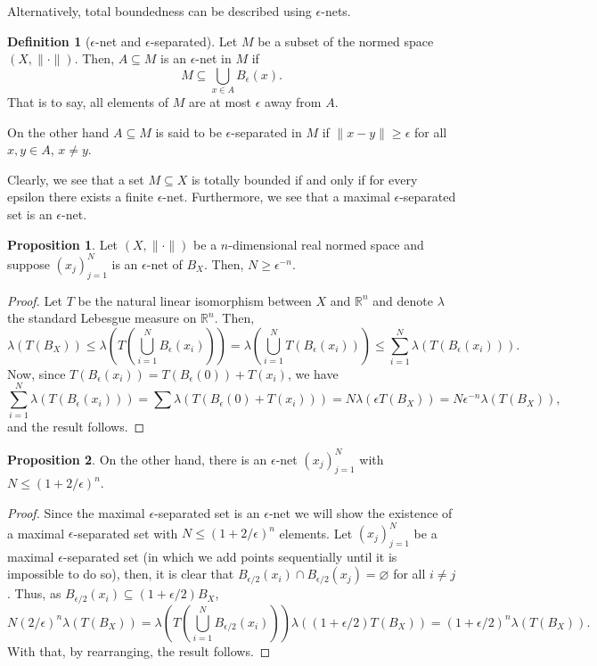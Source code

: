 \documentclass[
]{article}
\theoremstyle{definition}
\theoremstyle{definition}
\newtheorem{definition}{Definition}[section]
\newtheorem{proposition}{Proposition}[section]
\begin{document}
Alternatively, total boundedness can be described using \(\epsilon\)-nets. 

\begin{definition}[\(\epsilon\)-net and \(\epsilon\)-separated]
  Let \(M\) be a subset of the normed space \((X, \|\cdot\|)\). Then, 
  \(A \subseteq M\) is an \(\epsilon\)-net in \(M\) if 
  \[M \subseteq \bigcup_{x \in A} B_\epsilon(x).\]
  That is to say, all elements of \(M\) are at most \(\epsilon\) away from 
  \(A\). 
  
  On the other hand \(A \subseteq M\) is said to be \(\epsilon\)-separated in 
  \(M\) if \(\|x - y\| \ge \epsilon\) for all \(x, y \in A\), \(x \neq y\). 
\end{definition}

Clearly, we see that a set \(M \subseteq X\) is totally bounded if and only if 
for every epsilon there exists a finite \(\epsilon\)-net.
Furthermore, we see that a maximal \(\epsilon\)-separated set is an \(\epsilon\)-net.

\begin{proposition}
  Let \((X, \|\cdot\|)\) be a \(n\)-dimensional real normed space and suppose
  \((x_j)_{j = 1}^N\) is an \(\epsilon\)-net of \(B_X\). Then, 
  \(N \ge \epsilon^{-n}\).
\end{proposition}
\begin{proof}
  Let \(T\) be the natural linear isomorphism between \(X\) and \(\mathbb{R}^n\) 
  and denote \(\lambda\) the standard Lebesgue measure on \(\mathbb{R}^n\). Then, 
  \[\lambda(T(B_X)) \le \lambda\left(T\left(\bigcup_{i = 1}^N B_\epsilon(x_i)\right)\right)
  = \lambda\left(\bigcup_{i = 1}^N T(B_\epsilon(x_i))\right) 
  \le \sum_{i = 1}^N \lambda(T(B_\epsilon(x_i))).\]
  Now, since \(T(B_\epsilon(x_i)) = T(B_\epsilon(0)) + T(x_i)\), we have 
  \[\sum_{i = 1}^N \lambda(T(B_\epsilon(x_i))) = \sum \lambda(T(B_\epsilon(0) + T(x_i))) 
  = N \lambda(\epsilon T(B_X)) = N \epsilon^{-n} \lambda(T(B_X)),\]
  and the result follows.
\end{proof}

\begin{proposition}
  On the other hand, there is an \(\epsilon\)-net \((x_j)_{j = 1}^N\) with 
  \(N \le (1 + 2 / \epsilon)^n\).
\end{proposition}
\begin{proof}
  Since the maximal \(\epsilon\)-separated set is an \(\epsilon\)-net we will 
  show the existence of a maximal \(\epsilon\)-separated set with 
  \(N \le (1 + 2 / \epsilon)^n\) elements. Let \((x_j)_{j = 1}^N\) be a 
  maximal \(\epsilon\)-separated set (in which we add points sequentially 
  until it is impossible to do so), then, it is clear that 
  \(B_{\epsilon / 2}(x_i) \cap B_{\epsilon / 2}(x_j) = \varnothing\) for all 
  \(i \neq j\). Thus, as \(B_{\epsilon / 2}(x_i) \subseteq (1 + \epsilon / 2)B_X\), 
  \[N (2 / \epsilon)^{n} \lambda(T(B_X)) = 
    \lambda\left(T\left(\bigcup_{i = 1}^N B_{\epsilon / 2}(x_i)\right)\right) 
    \lambda((1 + \epsilon / 2)T(B_X)) = (1 + \epsilon / 2)^n \lambda(T(B_X)).\]
  With that, by rearranging, the result follows.
\end{proof}
\end{document}
